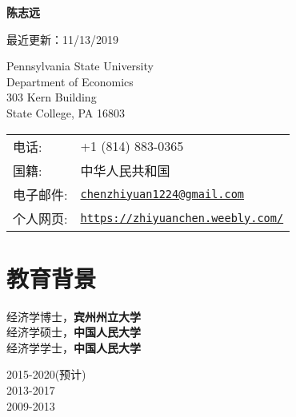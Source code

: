 \documentclass[letterpaper]{article}
\def\name{陈志远}
\begin{document}

\centerline{\huge \bf \name}

\vspace{1ex}
\begin{center}
    {\scriptsize 最近更新：11/13/2019}
\end{center}
\normalsize
\vspace{0.25in}

\begin{minipage}{0.5\linewidth}
  {Pennsylvania State University} \\
  Department of Economics \\
  303 Kern Building \\
  State College, PA 16803
\end{minipage}
\begin{minipage}{0.5\linewidth}
  \begin{tabular}{ll}
    电话: & +1 (814) 883-0365 \\
    国籍: &  中华人民共和国 \\
    电子邮件: & \href{mailto:chenzhiyuan1224@gmail.com}{\tt chenzhiyuan1224@gmail.com} \\
    个人网页: & \href{https://zhiyuanchen.weebly.com/}{\tt https://zhiyuanchen.weebly.com/} \\
  \end{tabular}
\end{minipage}





\section*{\textsc{教育背景}}

\begin{minipage}{0.5\linewidth}
  经济学博士，\textbf{宾州州立大学} \\
  经济学硕士，\textbf{中国人民大学}  \\ 
  经济学学士，\textbf{中国人民大学}
\end{minipage}
\begin{minipage}{0.5\linewidth}
  2015-2020(预计)\\
  2013-2017\\
  2009-2013
\end{minipage}
\end{document}
